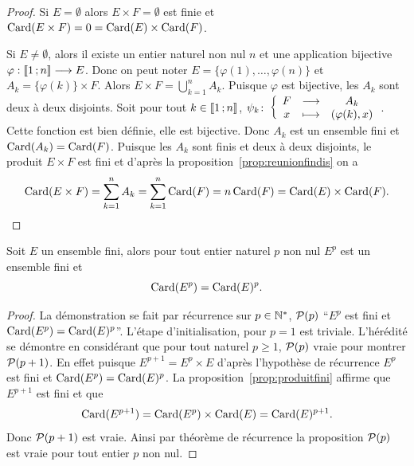 \begin{proof}
  Si \(E = \emptyset\) alors \(E\times F = \emptyset\) est finie et
  \(\Card(E\times F) = 0 = \Card(E)\times \Card(F)\).

  Si \(E\neq\emptyset\), alors il existe un entier naturel non nul \(n\) et une
  application bijective \(\fonctionR{\varphi}{\intervalleentier{1}{n}}{E}\).
  Donc on peut noter \(E = \{\varphi(1),\ldots ,\varphi(n)\}\) et \(A_k =
  \{\varphi(k)\}\times F\). Alors \(E\times F = \bigcup_{k = 1}^n A_k\).
  Puisque \(\varphi\) est bijective, les \(A_k\) sont deux à deux disjoints.
  Soit pour tout \(k\in\intervalleentier{1}{n}\),
  \(\fonction{\psi_k}{F}{A_k}{x}{(\varphi(k),x)}\). Cette fonction est bien
  définie, elle est bijective. Donc \(A_k\) est un ensemble fini et \(\Card(A_k)
  = \Card(F)\). Puisque les \(A_k\) sont finis et deux à deux disjoints, le
  produit \(E\times F\) est fini et d'après la
  proposition~\ref{prop:reunionfindis} on a
  \begin{equation}
    \Card(E\times F) = \sum_{k = 1}^{n} A_k = \sum_{k = 1}^{n}\Card(F) =
    n\Card(F) = \Card(E)\times \Card(F).
  \end{equation}
\end{proof}

\begin{prop}
  Soit \(E\) un ensemble fini, alors pour tout entier naturel \(p\) non nul
  \(E^p\) est un ensemble fini et
  \begin{equation}
    \Card(E^p) = \Card(E)^p.
  \end{equation}
\end{prop}

\begin{proof}
  La démonstration se fait par récurrence sur \(p\in\N^*\), \(\P(p)\) ``\(E^p\)
  est fini et \(\Card(E^p) = \Card(E)^p\)''. L'étape d'initialisation, pour \(p
  = 1\) est triviale. L'hérédité se démontre en considérant que pour tout
  naturel \(p\geqslant 1\), \(\P(p)\) vraie pour montrer \(\P(p + 1)\). En effet
  puisque \(E^{p + 1} = E^p \times E\) d'après l'hypothèse de récurrence \(E^p\)
  est fini et \(\Card(E^p) = \Card(E)^p\). La proposition~\ref{prop:produitfini}
  affirme que \(E^{p + 1}\) est fini et que
  \begin{equation}
    \Card(E^{p + 1}) = \Card(E^p)\times \Card(E) = \Card(E)^{p + 1}.
  \end{equation}
  Donc \(\P(p + 1)\) est vraie. Ainsi par théorème de récurrence la proposition
  \(\P(p)\) est vraie pour tout entier \(p\) non nul.
\end{proof}

